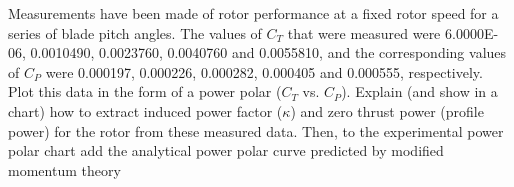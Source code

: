 \documentclass[12pt]{exam}
\begin{document}
\begin{questions}
\newpage 
\begin{question}
Measurements have been made of rotor performance at a fixed rotor speed for a series of
blade pitch angles. The values of \(C_T\) that were measured were 6.0000E-06, 0.0010490,
0.0023760, 0.0040760 and 0.0055810, and the corresponding values of \(C_P\) were 0.000197,
0.000226, 0.000282, 0.000405 and 0.000555, respectively. Plot this data in the form of a
power polar (\(C_T\) vs. \(C_P\)). Explain (and show in a chart) how to extract induced power factor
(\(\kappa\)) and zero thrust power (profile power) for the rotor from these measured data. Then, to
the experimental power polar chart add the analytical power polar curve predicted by
modified momentum theory
\end{question}
\begin{solutionorbox}[\stretch{1}]



\end{solutionorbox}
\end{questions}
\end{document}

